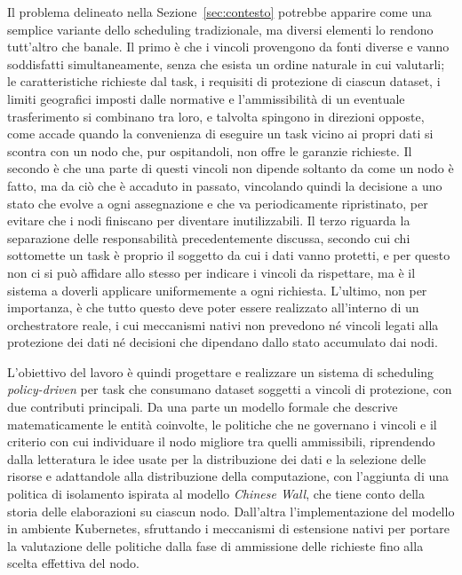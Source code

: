 Il problema delineato nella Sezione~\ref{sec:contesto} potrebbe apparire come una semplice variante dello scheduling tradizionale, ma diversi elementi lo rendono tutt'altro che banale. Il primo è che i vincoli provengono da fonti diverse e vanno soddisfatti simultaneamente, senza che esista un ordine naturale in cui valutarli; le caratteristiche richieste dal task, i requisiti di protezione di ciascun dataset, i limiti geografici imposti dalle normative e l'ammissibilità di un eventuale trasferimento si combinano tra loro, e talvolta spingono in direzioni opposte, come accade quando la convenienza di eseguire un task vicino ai propri dati si scontra con un nodo che, pur ospitandoli, non offre le garanzie richieste. Il secondo è che una parte di questi vincoli non dipende soltanto da come un nodo è fatto, ma da ciò che è accaduto in passato, vincolando quindi la decisione a uno stato che evolve a ogni assegnazione e che va periodicamente ripristinato, per evitare che i nodi finiscano per diventare inutilizzabili. Il terzo riguarda la separazione delle responsabilità precedentemente discussa, secondo cui chi sottomette un task è proprio il soggetto da cui i dati vanno protetti, e per questo non ci si può affidare allo stesso per indicare i vincoli da rispettare, ma è il sistema a doverli applicare uniformemente a ogni richiesta. L'ultimo, non per importanza, è che tutto questo deve poter essere realizzato all'interno di un orchestratore reale, i cui meccanismi nativi non prevedono né vincoli legati alla protezione dei dati né decisioni che dipendano dallo stato accumulato dai nodi.

L'obiettivo del lavoro è quindi progettare e realizzare un sistema di scheduling \emph{policy-driven} per task che consumano dataset soggetti a vincoli di protezione, con due contributi principali. Da una parte un modello formale che descrive matematicamente le entità coinvolte, le politiche che ne governano i vincoli e il criterio con cui individuare il nodo migliore tra quelli ammissibili, riprendendo dalla letteratura le idee usate per la distribuzione dei dati e la selezione delle risorse e adattandole alla distribuzione della computazione, con l'aggiunta di una politica di isolamento ispirata al modello \emph{Chinese Wall}, che tiene conto della storia delle elaborazioni su ciascun nodo. Dall'altra l'implementazione del modello in ambiente Kubernetes, sfruttando i meccanismi di estensione nativi per portare la valutazione delle politiche dalla fase di ammissione delle richieste fino alla scelta effettiva del nodo.

